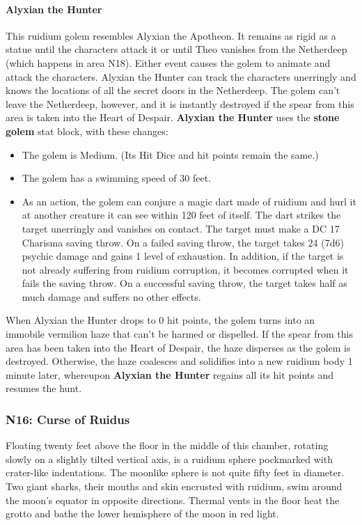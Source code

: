 \documentclass[10pt,a4,twoside,twocolumn,openany,nodeprecatedcode]{dndbook}
\begin{document}
\paragraph{Alyxian the Hunter}
This ruidium golem resembles Alyxian the Apotheon. It remains as rigid as a statue until the characters attack it or until Theo vanishes from the Netherdeep (which happens in area N18). Either event causes the golem to animate and attack the characters.
Alyxian the Hunter can track the characters unerringly and knows the locations of all the secret doors in the Netherdeep. The golem can't leave the Netherdeep, however, and it is instantly destroyed if the spear from this area is taken into the Heart of Despair.
\textbf{Alyxian the Hunter} uses the \textbf{stone golem} stat block, with these changes:
\begin{itemize}

\item The golem is Medium. (Its Hit Dice and hit points remain the same.)
\item The golem has a swimming speed of 30 feet.
\item As an action, the golem can conjure a magic dart made of ruidium and hurl it at another creature it can see within 120 feet of itself. The dart strikes the target unerringly and vanishes on contact. The target must make a DC 17 Charisma saving throw. On a failed saving throw, the target takes 24 (7d6) psychic damage and gains 1 level of exhaustion. In addition, if the target is not already suffering from ruidium corruption, it becomes corrupted when it fails the saving throw. On a successful saving throw, the target takes half as much damage and suffers no other effects.
\end{itemize}


When Alyxian the Hunter drops to 0 hit points, the golem turns into an immobile vermilion haze that can't be harmed or dispelled. If the spear from this area has been taken into the Heart of Despair, the haze disperses as the golem is destroyed. Otherwise, the haze coalesces and solidifies into a new ruidium body 1 minute later, whereupon \textbf{Alyxian the Hunter} regains all its hit points and resumes the hunt.
\subsubsection{N16: Curse of Ruidus}
\begin{DndReadAloud}{}
Floating twenty feet above the floor in the middle of this chamber, rotating slowly on a slightly tilted vertical axis, is a ruidium sphere pockmarked with crater-like indentations. The moonlike sphere is not quite fifty feet in diameter. Two giant sharks, their mouths and skin encrusted with ruidium, swim around the moon's equator in opposite directions. Thermal vents in the floor heat the grotto and bathe the lower hemisphere of the moon in red light.
\end{DndReadAloud}
\end{document}
